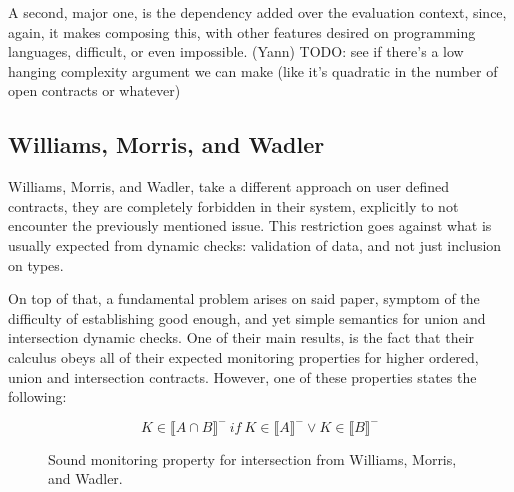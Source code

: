 \documentclass[sigplan,10pt,review,anonymous]{acmart}
\newcommand{\unsure}[2][1=]{}
\newcommand{\resolved}[2]{}
\newcommand{\nickel}[1]{\lstinline[language=nickel]{#1}}
\begin{document}
%
\resolved{(Yann) Is it really a
    problem per se? It is common thing to do (a nice declarative system
    for proofs and an algorithmic one for implementation, proved equivalent).
    Maybe the point is that the algorithmic system is way more complex than the
declarative one
(Teo) reworded}.
A second, major one,
is the dependency added over the evaluation context, since, again,
it makes composing this, with other features desired on programming languages,
difficult, or even impossible.
\resolved{(Yann) I think we need to substantiate this claim. If this
context dependency explains why CSE is invalid, maybe have a little example?
(Teo) I removed it, I don't think there's an example, mainly since
this context dependency is not part of the language. I do think it complicates
implementation of said feature}
\todo{(Yann) TODO: see if there's a low hanging complexity
    argument we can make (like it's quadratic in the number of open contracts or
whatever)}

\subsection{Williams, Morris, and Wadler}
\label{sec:will-morr-wadl}
\unsure{Subsection title?}

Williams, Morris, and Wadler, take a different approach on user defined contracts,
they are completely forbidden in their system, explicitly to not encounter
the previously mentioned issue.
This restriction goes against what is usually expected from dynamic checks:
validation of data, and not just inclusion on types.

On top of that, a fundamental problem arises on said paper,
symptom of the difficulty of establishing good enough, and yet
simple semantics for union and intersection dynamic checks.
One of their main results, is the fact that their calculus obeys
all of their expected monitoring properties for higher ordered, union
and intersection contracts.
However, one of these properties states the following:

\begin{figure}[h]
$$ K \in \llbracket A \cap B \rrbracket^-~if~K \in \llbracket A \rrbracket^- \lor K \in \llbracket B \rrbracket^- $$
\caption{Sound monitoring property for intersection from Williams, Morris, and Wadler.}
\label{fig:wmw-semantics}
\end{figure}
\end{document}

